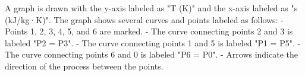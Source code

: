 A graph is drawn with the y-axis labeled as "T (K)" and the x-axis labeled as "s (kJ/kg·K)". The graph shows several curves and points labeled as follows:  
- Points 1, 2, 3, 4, 5, and 6 are marked.  
- The curve connecting points 2 and 3 is labeled "P2 = P3".  
- The curve connecting points 1 and 5 is labeled "P1 = P5".  
- The curve connecting points 6 and 0 is labeled "P6 = P0".  
- Arrows indicate the direction of the process between the points.